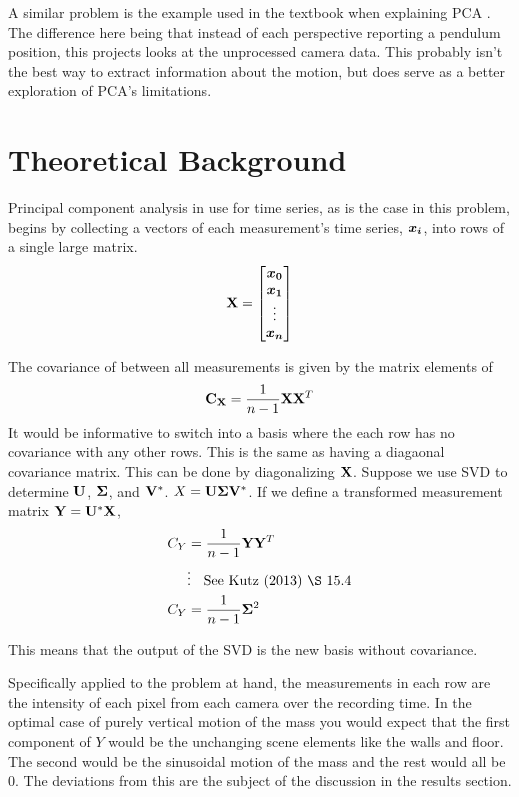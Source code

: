 \documentclass{article}
\begin{document}
    A similar problem is the example used in the textbook when explaining PCA
    \cite{Kutz2013}. The difference here being that instead of each perspective
    reporting a pendulum position, this projects looks at the unprocessed
    camera data. This probably isn't the best way to extract information about
    the motion, but does serve as a better exploration of PCA's limitations.

    \section{Theoretical Background}
    Principal component analysis in use for time series, as is the case in this
    problem, begins by collecting a vectors of each measurement's time series,
    $\vb*{x_i}$, into rows of a single large matrix.
    \begin{equation}
        \vb{X} = 
        \begin{bmatrix}
            \vb*{x_0}\\
            \vb*{x_1}\\
            \vdots \\
            \vb*{x_n}
        \end{bmatrix}
    \end{equation}

    The covariance of between all measurements is given by the matrix elements of
    \begin{equation}
        \vb{C}_{\vb{X}} = \frac{1}{n-1} \vb{X} \vb{X}^T
    \end{equation}
    It would be informative to switch into a basis where the each row has no
    covariance with any other rows. This is the same as having a diagaonal
    covariance matrix. This can be done by diagonalizing $\vb{X}$. Suppose we
    use SVD to determine $\vb{U}$, $\vb{\Sigma}$, and $\vb{V}^*$. $X=\vb{U} \vb{\Sigma} \vb{V}^*$. If we define
    a transformed measurement matrix $\vb{Y} = \vb{U}^* \vb{X}$,
    \begin{align*}
        C_Y &= \frac{1}{n-1} \vb{Y} \vb{Y}^T \\
         & \vdots \hspace{.125in} \textrm{See Kutz (2013) \S 15.4} \\
        C_Y &= \frac{1}{n-1} \vb{\Sigma}^2
    \end{align*}
    
    This means that the output of the SVD is the new basis without covariance.

    Specifically applied to the problem at hand, the measurements in each row
    are the intensity of each pixel from each camera over the recording time.
    In the optimal case of purely vertical motion of the mass you would expect
    that the first component of $Y$ would be the unchanging scene elements like
    the walls and floor. The second would be the sinusoidal motion of the mass
    and the rest would all be 0. The deviations from this are the subject of the
    discussion in the results section.
\end{document}
